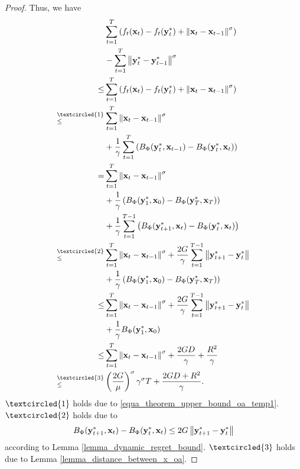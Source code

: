 \documentclass[journal]{IEEEtran}
\begin{document}
\begin{proof}
Thus, we have
\begin{align}
\nonumber
&\sum_{t=1}^T \lrincir{f_t(\x_t) - f_t(\y_t^{\ast}) + \lrnorm{\x_t - \x_{t-1}}^{\sigma} } \\ \nonumber
& - \sum_{t=1}^T \lrnorm{\y_t^\ast - \y_{t-1}^\ast}^{\sigma}  \\ \nonumber 
\le &\sum_{t=1}^T \lrincir{f_t(\x_t) - f_t(\y_t^{\ast}) + \lrnorm{\x_t - \x_{t-1}}^{\sigma} } \\ \nonumber
\refabovecir{\le}{\textcircled{1}} & \sum_{t=1}^T\lrnorm{\x_t - \x_{t-1}}^{\sigma}\\ \nonumber
&  + \frac{1}{\gamma}\sum_{t=1}^T\lrincir{ B_{\Phi}(\y_t^\ast, \x_{t-1}) -  B_{\Phi}(\y_t^\ast, \x_t)} \\ \nonumber
= & \sum_{t=1}^T\lrnorm{\x_t - \x_{t-1}}^{\sigma}\\ \nonumber
&  + \frac{1}{\gamma}\lrincir{B_{\Phi}(\y_1^\ast, \x_0) - B_{\Phi}(\y_T^\ast, \x_T)} \\ \nonumber
& + \frac{1}{\gamma}\sum_{t=1}^{T-1}\lrincir{ B_{\Phi}(\y_{t+1}^\ast, \x_t) -  B_{\Phi}(\y_t^\ast, \x_t)} \\ \nonumber
\refabovecir{\le}{\textcircled{2}} & \sum_{t=1}^T\lrnorm{\x_t - \x_{t-1}}^{\sigma} + \frac{2G}{\gamma}\sum_{t=1}^{T-1}\lrnorm{\y_{t+1}^{\ast} - \y_t^{\ast}} \\ \nonumber
& + \frac{1}{\gamma}\lrincir{B_{\Phi}(\y_1^{\ast}, \x_0) - B_{\Phi}(\y_T^{\ast}, \x_T)} \\ \nonumber
\le & \sum_{t=1}^T\lrnorm{\x_t - \x_{t-1}}^{\sigma} + \frac{2G}{\gamma}\sum_{t=1}^{T-1}\lrnorm{\y_{t+1}^{\ast} - \y_t^{\ast}} \\ \nonumber
& + \frac{1}{\gamma} B_{\Phi}(\y_1^{\ast}, \x_0) \\ \nonumber
\le & \sum_{t=1}^T\lrnorm{\x_t - \x_{t-1}}^{\sigma} + \frac{2GD}{\gamma} + \frac{R^2}{\gamma} \\ \nonumber
\refabovecir{\le}{\textcircled{3}} & \lrincir{\frac{2 G }{\mu}}^{\sigma} \gamma^{\sigma} T + \frac{2GD + R^2}{\gamma}.
\end{align} $\textcircled{1}$ holds due to \eqref{equa_theorem_upper_bound_oa_temp1}. 
$\textcircled{2}$ holds due to
\begin{align}
\nonumber
B_\Phi({\bf y}_{t+1}^\ast, {\bf x}_t) - B_{\Phi}({\bf y}_t^\ast, {\bf x}_t) \le  2G \left\lVert{\bf y}_{t+1}^\ast - {\bf y}_t^\ast\right\rVert
\end{align} according to Lemma \ref{lemma_dynamic_regret_bound}. $\textcircled{3}$ holds due to Lemma \ref{lemma_distance_between_x_oa}.


\end{proof}
\end{document}
